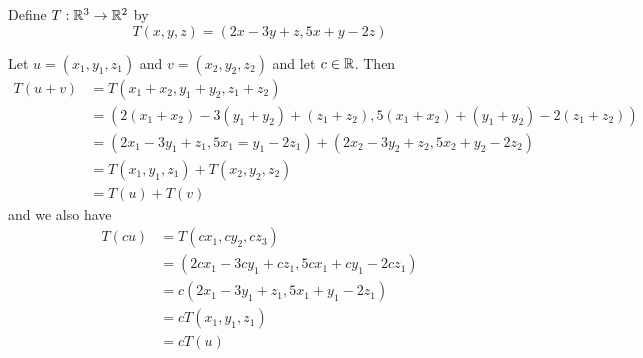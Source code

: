 \documentclass{article}
\begin{document}
\begin{example}
  Define $T: \mathbb{R}^3 \to \mathbb{R}^2$ by \[
    T(x, y, z) = (2x-3y+z, 5x+y - 2z)
  \]

  Let $u = (x_1,y_1,z_1)$ and $v = (x_2, y_2, z_2)$ and let $c \in \mathbb{R}$. Then
  \begin{align*}
    T(u+v) &= T(x_1 + x_2, y_1 + y_2, z_1 + z_2)\\
    &= (2(x_1 + x_2) - 3(y_1 + y_2) + (z_1 + z_2), 5(x_1 + x_2) + (y_1 + y_2) - 2(z_1 + z_2))\\
    &= (2x_1 - 3y_1 + z_1, 5x_1 = y_1 -2z_1) + (2x_2 - 3y_2 + z_2, 5x_2 + y_2 - 2z_2)\\
    &= T(x_1, y_1, z_1) + T(x_2, y_2, z_2)\\
    &= T(u) + T(v)
  \end{align*}
  and we also have
  \begin{align*}
    T(cu) &= T(cx_1, cy_2, cz_3)\\
    &= (2cx_1 - 3cy_1 + cz_1, 5cx_1 + cy_1 -2cz_1)\\
    &= c(2x_1 - 3y_1 + z_1, 5x_1 + y_1 - 2z_1)\\
    &= cT(x_1, y_1, z_1)\\
    &= cT(u)
  \end{align*}


\end{example}
\end{document}
